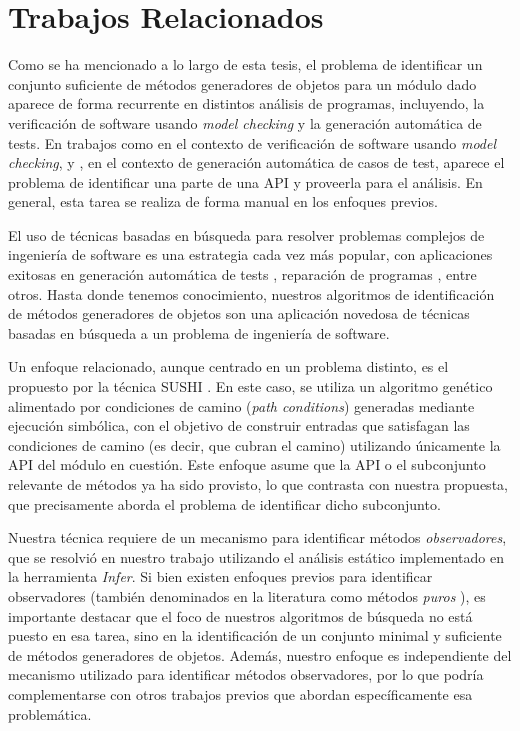 \chapter[Trabajos Relacionados]{Trabajos Relacionados}
\label{cap:related-work}

Como se ha mencionado a lo largo de esta tesis, el problema de identificar un conjunto suficiente de métodos generadores de objetos 
para un módulo dado aparece de forma recurrente en distintos análisis de
programas, incluyendo, la verificación de software usando \emph{model checking} y la generación automática de tests.
En trabajos como \cite{DBLP:conf/tacas/NoriRTT09,DBLP:conf/tacas/KhurshidPV03} en el contexto de verificación 
de software usando \emph{model checking}, y
\cite{Tillmann:2010,Tillmann:2008,Pacheco07,DBLP:conf/icse/BraioneDMP18}, en
el contexto de generación automática de casos de test, aparece el problema de 
identificar una parte de una API y proveerla para el análisis. En general, esta tarea se realiza de forma manual en los enfoques previos.

El uso de técnicas basadas en búsqueda para resolver problemas complejos de
ingeniería de software es una estrategia cada vez más popular, con aplicaciones
exitosas en generación automática de tests \cite{Fraser:2011}, reparación de programas 
\cite{DBLP:journals/tse/GouesNFW12}, entre otros. Hasta donde tenemos
conocimiento, nuestros algoritmos de identificación de métodos generadores de
objetos son una aplicación novedosa de técnicas basadas en búsqueda a un problema de ingeniería
de software.

Un enfoque relacionado, aunque centrado en un problema distinto, es el propuesto
por la técnica \textsf{SUSHI} 
\cite{DBLP:conf/icse/BraioneDMP18}. En este caso, se utiliza un algoritmo genético alimentado por condiciones de camino 
(\emph{path conditions}) generadas mediante ejecución simbólica, con el objetivo
de construir entradas que satisfagan las condiciones de camino (es decir, que
cubran el camino) utilizando únicamente la API del módulo
en cuestión. Este enfoque asume que la API o el subconjunto relevante de métodos
ya ha sido provisto, lo que contrasta con nuestra propuesta, que precisamente aborda el problema de identificar dicho subconjunto.

Nuestra técnica requiere de un mecanismo para identificar métodos
\emph{observadores}, que se resolvió en nuestro trabajo utilizando el análisis estático 
implementado en la herramienta \emph{Infer}. 
Si bien existen enfoques previos para identificar observadores (también
    denominados en la literatura como métodos \emph{puros}
\cite{Huang:2012,Salcianu:2005}), es importante destacar que el 
foco de nuestros algoritmos de búsqueda no está puesto en esa tarea, sino en la
identificación de un conjunto minimal y suficiente de métodos generadores de objetos.
Además, nuestro enfoque es independiente del mecanismo utilizado para
identificar métodos observadores, por lo que podría 
complementarse con otros trabajos previos que abordan específicamente esa problemática.

